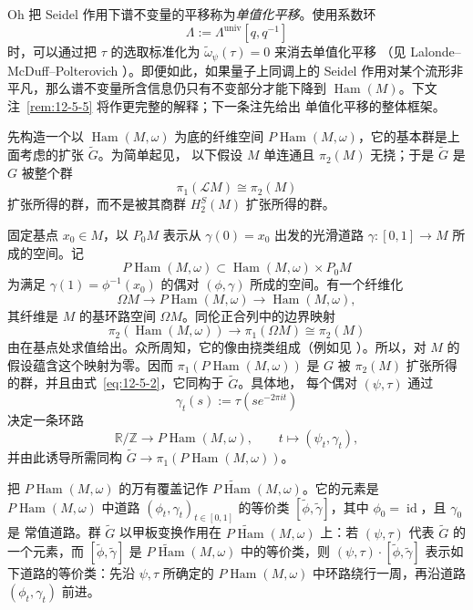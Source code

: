 Oh  把 Seidel 作用下谱不变量的平移称为\emph{单值化平移}。使用系数环
\[
  \Lambda:=\Lambda^{\mathrm{univ}}[q,q^{-1}]
\]
时，可以通过把 $\tau$ 的选取标准化为 $\widetilde\omega_\psi(\tau)=0$ 来消去单值化平移
（见 Lalonde--McDuff--Polterovich ）。即便如此，如果量子上同调上的 Seidel
作用对某个流形非平凡，那么谱不变量所含信息仍只有不变部分才能下降到
$\operatorname{Ham}(M)$。下文注~\ref{rem:12-5-5} 将作更完整的解释；下一条注先给出
单值化平移的整体框架。

\begin{remark}\label{rem:12-5-4}
先构造一个以 $\operatorname{Ham}(M,\omega)$ 为底的纤维空间
$P\operatorname{Ham}(M,\omega)$，它的基本群是上面考虑的扩张 $\widetilde G$。为简单起见，
以下假设 $M$ 单连通且 $\pi_2(M)$ 无挠；于是 $\widetilde G$ 是 $G$ 被整个群
\[
  \pi_1(\mathcal L M)\cong\pi_2(M)
\]
扩张所得的群，而不是被其商群 $H_2^S(M)$ 扩张所得的群。

固定基点 $x_0\in M$，以 $P_0M$ 表示从 $\gamma(0)=x_0$ 出发的光滑道路
$\gamma:[0,1]\to M$ 所成的空间。记
\[
  P\operatorname{Ham}(M,\omega)
  \subset\operatorname{Ham}(M,\omega)\times P_0M
\]
为满足 $\gamma(1)=\phi^{-1}(x_0)$ 的偶对 $(\phi,\gamma)$ 所成的空间。有一个纤维化
\[
  \Omega M\longrightarrow P\operatorname{Ham}(M,\omega)
  \longrightarrow\operatorname{Ham}(M,\omega),
\]
其纤维是 $M$ 的基环路空间 $\Omega M$。同伦正合列中的边界映射
\[
  \pi_2(\operatorname{Ham}(M,\omega))
  \longrightarrow\pi_1(\Omega M)\cong\pi_2(M)
\]
由在基点处求值给出。众所周知，它的像由挠类组成（例如见 ）。所以，对 $M$
的假设蕴含这个映射为零。因而 $\pi_1(P\operatorname{Ham}(M,\omega))$ 是 $G$ 被
$\pi_2(M)$ 扩张所得的群，并且由式~\eqref{eq:12-5-2}，它同构于 $\widetilde G$。具体地，
每个偶对 $(\psi,\tau)$ 通过
\[
  \gamma_t(s):=\tau(se^{-2\pi it})
\]
决定一条环路
\[
  \mathbb R/\mathbb Z\longrightarrow P\operatorname{Ham}(M,\omega),
  \qquad t\longmapsto(\psi_t,\gamma_t),
\]
并由此诱导所需同构
$\widetilde G\to\pi_1(P\operatorname{Ham}(M,\omega))$。

把 $P\operatorname{Ham}(M,\omega)$ 的万有覆盖记作
$\widetilde{P\operatorname{Ham}}(M,\omega)$。它的元素是
$P\operatorname{Ham}(M,\omega)$ 中道路 $(\phi_t,\gamma_t)_{t\in[0,1]}$ 的等价类
$[\widetilde\phi,\widetilde\gamma]$，其中 $\phi_0=\operatorname{id}$，且 $\gamma_0$ 是
常值道路。群 $\widetilde G$ 以甲板变换作用在
$\widetilde{P\operatorname{Ham}}(M,\omega)$ 上：若 $(\psi,\tau)$ 代表
$\widetilde G$ 的一个元素，而 $[\widetilde\phi,\widetilde\gamma]$ 是
$\widetilde{P\operatorname{Ham}}(M,\omega)$ 中的等价类，则
$(\psi,\tau)\cdot[\widetilde\phi,\widetilde\gamma]$ 表示如下道路的等价类：先沿
$\psi,\tau$ 所确定的 $P\operatorname{Ham}(M,\omega)$ 中环路绕行一周，再沿道路
$(\phi_t,\gamma_t)$ 前进。


\end{remark}
